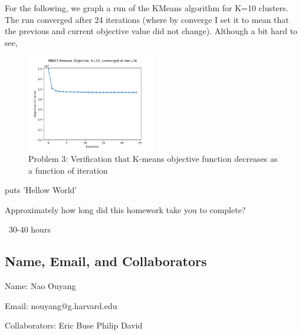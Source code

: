 \documentclass[submit]{harvardml}
\newenvironment{answer}{%
\color{answergreen}\sffamily\large}{}
\begin{document}
\begin{itemize}
\begin{answer}
        For the following, we graph a run of the KMeans algorithm for K=10 clusters. The run
        converged after 24 iterations (where by converge I set it to mean that the previous and
        current objective value did not change). Although a bit hard to see, 
    \begin{figure}[ht]
        \centering
        \includegraphics[width=0.5\textwidth]{p3_costvsiter.png}
        \caption{Problem 3: Verification that K-means objective function decreases as a function of
        iteration}
        \label{cost}
    \end{figure}
    puts 'Hellow World'
\end{answer}

\end{itemize}



\newpage
\begin{problem}[Calibration, 1pt]
Approximately how long did this homework take you to complete?
\end{problem}

~30-40 hours
\subsection*{Name, Email, and Collaborators}

Name: Nao Ouyang

Email: nouyang@g.harvard.edu    

Collaborators:
Eric
Buse
Philip
David
\end{document}
